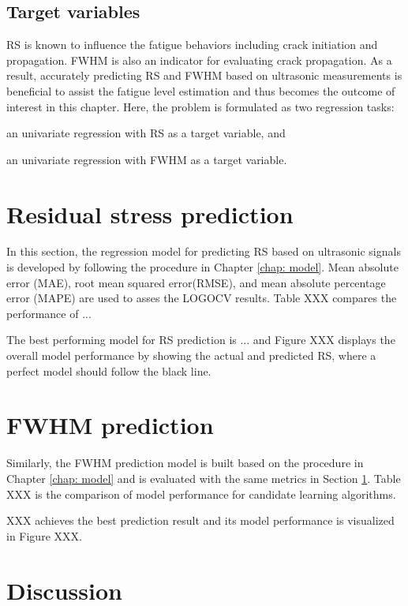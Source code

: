 \subsection{Target variables}
RS is known to influence the fatigue behaviors including crack initiation and propagation. FWHM is also an indicator for evaluating crack propagation. As a result, accurately predicting RS and FWHM based on ultrasonic measurements is beneficial to assist the fatigue level estimation and thus becomes the outcome of interest in this chapter. Here, the problem is formulated as two regression tasks:
\begin{enumerate*}[label=\itshape\alph*\upshape)]
    \item an univariate regression with RS as a target variable, and
    \item an univariate regression with FWHM as a target variable.
\end{enumerate*}


\section{Residual stress prediction}
\label{sec: rs prediction}
In this section, the regression model for predicting RS based on ultrasonic signals is developed by following the procedure in Chapter \ref{chap: model}. Mean absolute error (MAE), root mean squared error(RMSE), and mean absolute percentage error (MAPE) are used to asses the LOGOCV results. Table XXX compares the performance of ... 

The best performing model for RS prediction is ... and Figure XXX displays the overall model performance by showing the actual and predicted RS, where a perfect model should follow the black line.

\section{FWHM prediction}
Similarly, the FWHM prediction model is built based on the procedure in Chapter \ref{chap: model} and is evaluated with the same metrics in Section \ref{sec: rs prediction}. Table XXX is the comparison of model performance for candidate learning algorithms.

XXX achieves the best prediction result and its model performance is visualized in Figure XXX.

\section{Discussion}